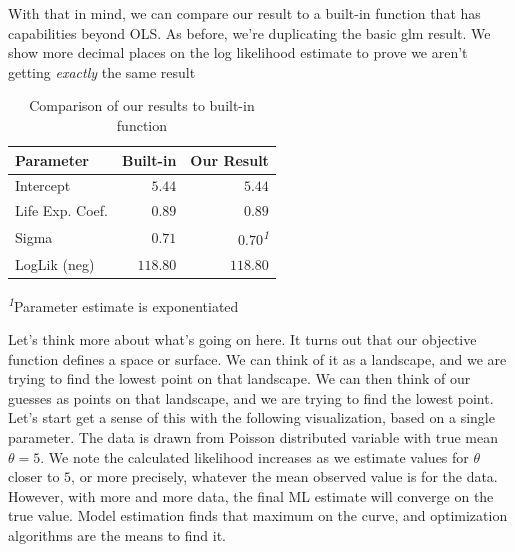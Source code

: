 \documentclass[
  letterpaper,
]{krantz}
\begin{document}
With that in mind, we can compare our result to a built-in function that
has capabilities beyond OLS. As before, we're duplicating the basic glm
result. We show more decimal places on the log likelihood estimate to
prove we aren't getting \emph{exactly} the same result

\setlength{\LTpost}{0mm}

\begin{longtable}{lrr}

\caption{\label{tbl-r-likelihood}Comparison of our results to built-in
function}

\tabularnewline

\toprule
Parameter & Built-in & Our Result \\ 
\midrule\addlinespace[2.5pt]
Intercept & \textcolor[HTML]{404040}{$5.44$} & \textcolor[HTML]{404040}{$5.44$} \\ 
Life Exp. Coef. & \textcolor[HTML]{404040}{$0.89$} & \textcolor[HTML]{404040}{$0.89$} \\ 
Sigma & \textcolor[HTML]{404040}{$0.71$} & \textcolor[HTML]{404040}{$0.70$\textsuperscript{\textit{1}}} \\ 
LogLik (neg) & \textcolor[HTML]{404040}{$118.80$} & \textcolor[HTML]{404040}{$118.80$} \\ 
\bottomrule

\end{longtable}

\begin{minipage}{\linewidth}
\textsuperscript{\textit{1}}Parameter estimate is exponentiated\\
\end{minipage}

Let's think more about what's going on here. It turns out that our
objective function defines a space or surface. We can think of it as a
landscape, and we are trying to find the lowest point on that landscape.
We can then think of our guesses as points on that landscape, and we are
trying to find the lowest point. Let's start get a sense of this with
the following visualization, based on a single parameter. The data is
drawn from Poisson distributed variable with true mean \(\theta=5\). We
note the calculated likelihood increases as we estimate values for
\(\theta\) closer to \(5\), or more precisely, whatever the mean
observed value is for the data. However, with more and more data, the
final ML estimate will converge on the true value. Model estimation
finds that maximum on the curve, and optimization algorithms are the
means to find it.
\end{document}
